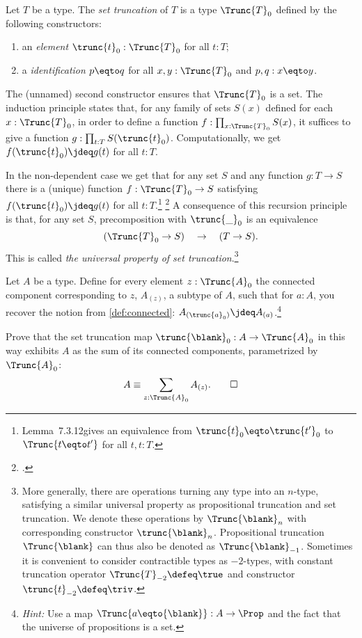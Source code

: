 \begin{definition}\label{def:set-truncation}
Let $T$ be a type. The \emph{set truncation} of $T$
is a type  $\Trunc{T}_0$ defined by the following constructors:
\begin{enumerate}
\item an \emph{element} $\trunc{t}_0 : \Trunc{T}_0$ for all $t:T$;
\item a \emph{identification} $p \eqto q$ for all $x,y:\Trunc{T}_0$ and $p,q: x \eqto y$.
\end{enumerate}
The (unnamed) second constructor ensures that $\Trunc{T}_0$ is a
set. The induction principle states that,
for any family of sets $S(x)$ defined for each $x:\Trunc{T}_0$,
in order to define a function $f:\prod_{x:\Trunc{T}_0} S(x)$,
it suffices to give a function $g: \prod_{t:T} S(\trunc{t}_0)$.
Computationally, we get $f(\trunc{t}_0)\jdeq g(t)$ for all $t:T$.
\end{definition}

In the non-dependent case we get that for any set $S$ and
any function $g: T\to S$ there is a (unique) function $f:\Trunc{T}_0\to S$
satisfying $f(\trunc{t}_0)\jdeq g(t)$ for all $t:T$.\footnote{%
Lemma~7.3.12\footnotemark gives an equivalence from
$\trunc{t}_0 \eqto \trunc{t'}_0$ to $\Trunc{t \eqto t'}$ for all $t,t:T$.}%
\footcitetext{hottbook}
A consequence of this recursion principle is that,
for any set $S$, precomposition with $\trunc{\_}_0$ is an equivalence
\[
(\Trunc{T}_0 \to S) \quad \to \quad (T \to S).
\]
This is called \emph{the universal property of set truncation}.\footnote{%
More generally, there are operations turning any type into an $n$-type,
satisfying a similar universal property as propositional truncation
and set truncation. We denote these operations
by $\Trunc{\blank}_n$ with corresponding constructor $\trunc{\blank}_n$.
Propositional truncation $\Trunc{\blank}$ can thus also be denoted as
$\Trunc{\blank}_{-1}$. Sometimes it is convenient to consider
contractible types as $-2$-types, with constant truncation operator
$\Trunc{T}_{-2}\defeq\true$ and 
constructor $\trunc{t}_{-2}\defeq\triv$.
}%

\begin{xca}\label{xca:sum-of-conn-components}
  Let $A$ be a type. Define for every element $z : \Trunc{A}_0$
  the connected component corresponding to $z$, $A_{(z)}$,
  a subtype of $A$, such that for $a:A$, you recover the notion from
  \cref{def:connected}: $A_{(\trunc{a}_0)} \jdeq A_{(a)}$.\footnote{%
    \emph{Hint:} Use a map $\Trunc{a \eqto {\blank}} : A \to \Prop$
    and the fact that the universe of propositions
    is a set.}

  Prove that the set truncation map $\trunc{\blank}_0 : A \to \Trunc{A}_0$
  in this way exhibits $A$ as the sum of its connected components,
  parametrized by $\Trunc{A}_0$:
  \[
    A \equiv \sum_{z : \Trunc{A}_0} A_{(z)}. \qedhere
  \]
\end{xca}


